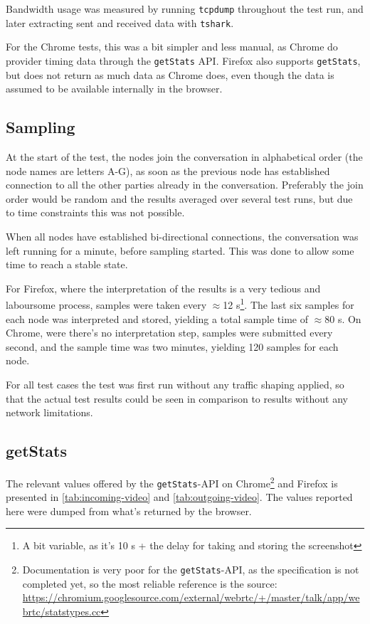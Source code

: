 Bandwidth usage was measured by running \texttt{tcpdump} throughout the test run, and later extracting sent and received data with \texttt{tshark}.

For the Chrome tests, this was a bit simpler and less manual, as Chrome do provider timing data through the \texttt{getStats} API. Firefox also supports \texttt{getStats}, but does not return as much data as Chrome does, even though the data is assumed to be available internally in the browser.


\subsection{Sampling}

At the start of the test, the nodes join the conversation in alphabetical order (the node names are letters A-G), as soon as the previous node has established connection to all the other parties already in the conversation. Preferably the join order would be random and the results averaged over several test runs, but due to time constraints this was not possible.

When all nodes have established bi-directional connections, the conversation was left running for a minute, before sampling started. This was done to allow some time to reach a stable state.

For Firefox, where the interpretation of the results is a very tedious and laboursome process, samples were taken every $\approx$12 s\footnote{A bit variable, as it's 10 s + the delay for taking and storing the screenshot}. The last six samples for each node was interpreted and stored, yielding a total sample time of $\approx$80 s. On Chrome, were there's no interpretation step, samples were submitted every second, and the sample time was two minutes, yielding 120 samples for each node.

For all test cases the test was first run without any traffic shaping applied, so that the actual test results could be seen in comparison to results without any network limitations.


\subsection{getStats}

The relevant values offered by the \texttt{getStats}-API on Chrome\footnote{Documentation is very poor for the \texttt{getStats}-API, as the specification is not completed yet, so the most reliable reference is the source: \url{https://chromium.googlesource.com/external/webrtc/+/master/talk/app/webrtc/statstypes.cc}} and Firefox is presented in \autoref{tab:incoming-video} and \autoref{tab:outgoing-video}. The values reported here were dumped from what's returned by the browser.

